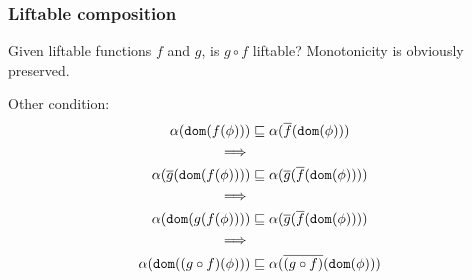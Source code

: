 \documentclass[11pt,a4paper]{article}
\begin{document}
\subsubsection{Liftable composition}
Given liftable functions $f$ and $g$, is $g \circ f$ liftable?
Monotonicity is obviously preserved.

Other condition:
\begin{align*}
\alpha(\texttt{dom}(f(\phi))) &\sqsubseteq \alpha(\overline{f}(\texttt{dom}(\phi))) \\
\implies \\
\alpha(\overline{g}(\texttt{dom}(f(\phi)))) &\sqsubseteq \alpha(\overline{g}(\overline{f}(\texttt{dom}(\phi)))) \\
\implies \\
\alpha(\texttt{dom}(g(f(\phi)))) &\sqsubseteq \alpha(\overline{g}(\overline{f}(\texttt{dom}(\phi)))) \\
\implies \\
\alpha(\texttt{dom}((g \circ f)(\phi))) &\sqsubseteq \alpha(\overline{(g \circ f)}(\texttt{dom}(\phi))) \\
\end{align*}






\end{document}
